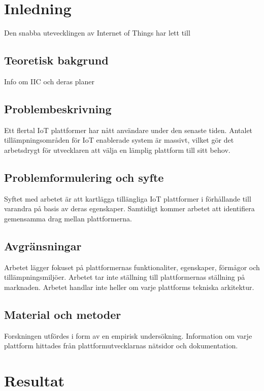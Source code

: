 
\section{Inledning}
Den snabba utevecklingen av Internet of Things har lett till 

\subsection{Teoretisk bakgrund}
Info om IIC och deras planer

\subsection{Problembeskrivning}
Ett flertal IoT plattformer har nått användare under den senaste tiden.
Antalet tillämpningsområden för IoT enablerade system är massivt,
vilket gör det arbetsdrygt för utvecklaren att välja en lämplig plattform
till sitt behov.

\subsection{Problemformulering och syfte}
Syftet med arbetet är att kartlägga tillängliga IoT plattformer i förhållande
till varandra på basis av deras egenskaper. Samtidigt kommer arbetet
att identifiera gemensamma drag mellan plattformerna. 

\subsection{Avgränsningar}
Arbetet lägger fokuset på plattformernas funktionaliter, egenskaper, förmågor
och tillämpningsmiljöer.
Arbetet tar inte ställning till plattformernas ställning på marknaden.
Arbetet handlar inte heller om varje plattforms tekniska arkitektur.

\subsection{Material och metoder}
Forskningen utfördes i form av en empirisk undersökning. Information om varje
plattform hittades från plattformutvecklarnas nätsidor och dokumentation.




\section{Resultat}
\label{sec:esimluku}

